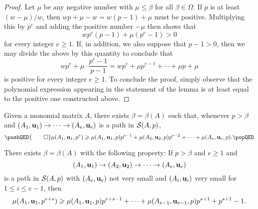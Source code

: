 \documentclass[11pt]{amsart}
\begin{document}
\begin{proof}
Let $\mu$ be any negative number with $\mu \leq \beta$ for all $\beta \in \Omega$.    If $p$ is at least $(w-\mu)/w$, then $wp + \mu - w = w(p-1) + \mu$ must be positive.  Multiplying this by $p^e$ and adding the positive number $-\mu$ then shows that
%
\[ wp^e ( p-1 ) + \mu (p^e-1) > 0 \] for every integer $e \geq 1$.   If, in addition, we also suppose that $p -1 > 0$, then we may divide the above by this quantity to conclude that \[ w p^e + \mu \cdot \frac{ p^e - 1}{p-1} = wp^e + \mu p^{e-1} + \cdots + \mu p + \mu \] is positive for every integer $e \geq 1$.   To conclude the proof, simply observe that the polynomial expression appearing in the statement of the lemma is at least equal to the positive one constructed above.
\end{proof}


\begin{corollary}\label{cor: iterated lifting}
   Given a monomial matrix $A$, there exists $\beta = \beta(A)$ such that, whenever $p > \beta$ and
   $(A_1, \mathbf{u}_1) \to \cdots \to (A_e, \mathbf{u}_e)$ is a path in $\mathcal{S}(A,p)$,
 \[ \pushQED{\qed} \mu(A_1, \vv{u}_1, p^e) \geq \mu(A_1, \vv{u}_1, p)p^{e-1} + \mu(A_2, \vv{u}_2, p) p^{e-2} + \cdots + \mu(A_{e}, \vv{u}_{e}, p). \qedhere\popQED\]
\end{corollary}


\begin{proposition}\label{prop: ineq for higher mus in terminal paths}
 There exists $\beta = \beta(A)$ with the following property\textup:  If $p > \beta$ and $e \geq 1$ and
 \[
  (A_1, \mathbf{u}_1) \to (A_2, \mathbf{u}_2) \to \cdots \to (A_e, \mathbf{u}_e)
 \]
 is a path in $\mathcal{S}(A,p)$ with $(A_e, \mathbf{u}_e)$ not very small and  $(A_i, \mathbf{u}_i)$ very small for $1 \leq i \leq e-1$, then  
\[
 \mu(A_1, \mathbf{u}_1, p^{e+s}) \geqslant \mu(A_1, \mathbf{u}_1, p) p^{e+s-1} + \cdots + \mu(A_{e-1}, \mathbf{u}_{e-1}, p) p^{s+1} + p^{s+1} - 1.
\]
\end{proposition}

\end{document}
